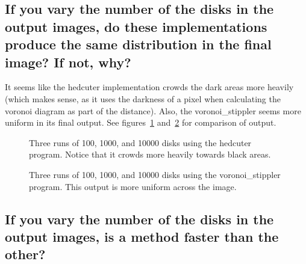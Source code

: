 \documentclass[11pt]{article}
\begin{document}
\subsection{If you vary the number of the disks in the output images,
  do these implementations produce the same distribution in the final
  image? If not, why?}

It seems like the hedcuter implementation crowds the dark areas more
heavily (which makes sense, as it uses the darkness of a pixel when
calculating the voronoi diagram as part of the distance). Also, the
voronoi\_stippler seems more uniform in its final output.  See
figures~\ref{hc_b} and~\ref{vs_b} for comparison of output.

\begin{figure}[h]
  \centering
  \begin{minipage}{.32\textwidth}
    \centering
    
  \end{minipage}%
  \begin{minipage}{.32\textwidth}
    \centering
    
  \end{minipage}
  \begin{minipage}{.32\textwidth}
    \centering
    
  \end{minipage}
  \caption{Three runs of 100, 1000, and 10000 disks using the hedcuter
  program. Notice that it crowds more heavily towards black areas.}\label{hc_b}
\end{figure}

\begin{figure}[H]
  \centering
  \begin{minipage}{.32\textwidth}
    \centering
    
  \end{minipage}%
  \begin{minipage}{.32\textwidth}
    \centering
    
  \end{minipage}
  \begin{minipage}{.32\textwidth}
    \centering
    
  \end{minipage}
  \caption{Three runs of 100, 1000, and 10000 disks using the
    voronoi\_stippler program. This output is more uniform across the
    image.}\label{vs_b}
\end{figure}

\subsection{If you vary the number of the disks in the output images,
  is a method faster than the other?}
\end{document}
